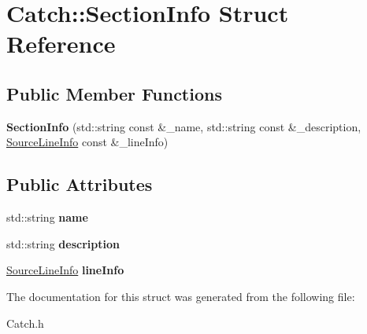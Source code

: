 \hypertarget{struct_catch_1_1_section_info}{\section{Catch\-:\-:Section\-Info Struct Reference}
\label{struct_catch_1_1_section_info}
}
\subsection*{Public Member Functions}
\begin{DoxyCompactItemize}
\item 
\hypertarget{struct_catch_1_1_section_info_ab903cdd547bc8653fca326154b6a9363}{{\bfseries Section\-Info} (std\-::string const \&\-\_\-name, std\-::string const \&\-\_\-description, \hyperlink{struct_catch_1_1_source_line_info}{Source\-Line\-Info} const \&\-\_\-line\-Info)}\label{struct_catch_1_1_section_info_ab903cdd547bc8653fca326154b6a9363}

\end{DoxyCompactItemize}
\subsection*{Public Attributes}
\begin{DoxyCompactItemize}
\item 
\hypertarget{struct_catch_1_1_section_info_a704c8fc662d309137e0d4f199cb7df58}{std\-::string {\bfseries name}}\label{struct_catch_1_1_section_info_a704c8fc662d309137e0d4f199cb7df58}

\item 
\hypertarget{struct_catch_1_1_section_info_a0052060219a6de74bb7ade34d4163a4e}{std\-::string {\bfseries description}}\label{struct_catch_1_1_section_info_a0052060219a6de74bb7ade34d4163a4e}

\item 
\hypertarget{struct_catch_1_1_section_info_adbc83b8a3507c4acc8ee249e93465711}{\hyperlink{struct_catch_1_1_source_line_info}{Source\-Line\-Info} {\bfseries line\-Info}}\label{struct_catch_1_1_section_info_adbc83b8a3507c4acc8ee249e93465711}

\end{DoxyCompactItemize}


The documentation for this struct was generated from the following file\-:\begin{DoxyCompactItemize}
\item 
Catch.\-h\end{DoxyCompactItemize}

